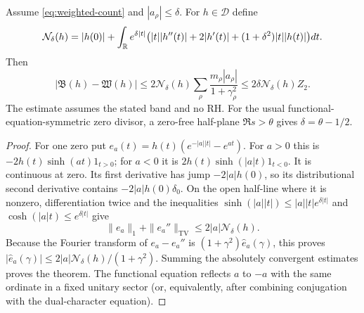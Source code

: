 \begin{theorem}\label{thm:band-bound}
Assume \eqref{eq:weighted-count} and $|a_\rho|\leq\delta$.
For $h\in\mathcal D$ define
\[
 \mathcal N_\delta(h)=|h(0)|+
  \int_\mathbb R e^{\delta|t|}
  \bigl(|t||h''(t)|+2|h'(t)|+(1+\delta^2)|t||h(t)|\bigr)dt.
\]
Then
\begin{equation}\label{eq:band-bound}
 |\mathfrak B(h)-\mathfrak W(h)|
 \leq 2\mathcal N_\delta(h)
          \sum_\rho\frac{m_\rho|a_\rho|}{1+\gamma_\rho^2}
 \leq2\delta\mathcal N_\delta(h)Z_2.
\end{equation}
The estimate assumes the stated band and no RH. For the usual
functional-equation-symmetric zero divisor, a zero-free half-plane
$\Re s>\theta$ gives $\delta=\theta-1/2$.
\end{theorem}
\begin{proof}
For one zero put
$e_a(t)=h(t)(e^{-|a||t|}-e^{at})$. For $a>0$ this is
$-2h(t)\sinh(at)1_{t>0}$; for $a<0$ it is
$2h(t)\sinh(|a|t)1_{t<0}$. It is continuous at zero. Its
first derivative has jump $-2|a|h(0)$, so its distributional
second derivative contains $-2|a|h(0)\delta_0$.
On the open half-line where it is nonzero, differentiation twice
and the inequalities
$\sinh(|a||t|)\leq|a||t|e^{\delta|t|}$ and
$\cosh(|a|t)\leq e^{\delta|t|}$ give
\[
 \|e_a\|_1+\|e_a''\|_{\mathrm{TV}}
      \leq2|a|\mathcal N_\delta(h).
\]
Because the Fourier transform of $e_a-e_a''$ is
$(1+\gamma^2)\widehat e_a(\gamma)$, this proves
$|\widehat e_a(\gamma)|\leq
2|a|\mathcal N_\delta(h)/(1+\gamma^2)$.
Summing the absolutely convergent estimates proves the theorem.
The functional equation reflects $a$ to $-a$ with the same
ordinate in a fixed unitary sector (or, equivalently, after
combining conjugation with the dual-character equation).
\end{proof}
